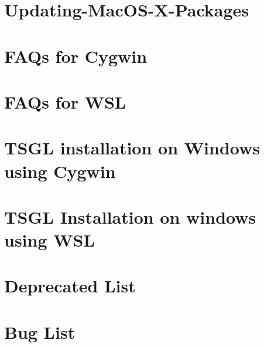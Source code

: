 \let\mypdfximage\pdfximage\def\pdfximage{\immediate\mypdfximage}\documentclass[twoside]{book}
\newcommand{\+}{\discretionary{\mbox{\scriptsize$\hookleftarrow$}}{}{}}
\begin{document}
\chapter{Updating-\/\+Mac\+O\+S-\/\+X-\/\+Packages}
\label{md__home_rvree__t_s_g_l_2_81__t_s_g_l__t_s_g_l_8wiki__updating-_mac_o_s-_x-_packages}

\chapter{F\+A\+Qs for Cygwin}
\label{md__home_rvree__t_s_g_l_2_81__t_s_g_l__windows__f_a_qcygwin}

\chapter{F\+A\+Qs for W\+SL}
\label{md__home_rvree__t_s_g_l_2_81__t_s_g_l__windows__f_a_qwsl}

\chapter{T\+S\+GL installation on Windows using Cygwin}
\label{md__home_rvree__t_s_g_l_2_81__t_s_g_l__windows_readme_cygwin}

\chapter{T\+S\+GL Installation on windows using W\+SL}
\label{md__home_rvree__t_s_g_l_2_81__t_s_g_l__windows_readme_w_s_l}

\chapter{Deprecated List}
\label{deprecated}

\chapter{Bug List}
\label{bug}

\end{document}

